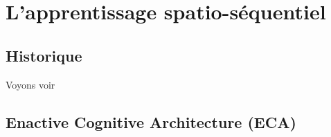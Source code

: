 \chapter{L'apprentissage spatio-séquentiel}

\section{Historique}

Voyons voir

\section{Enactive Cognitive Architecture (ECA)}
